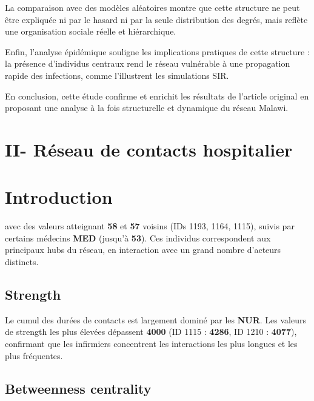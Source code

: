 \documentclass[10pt,twocolumn]{article}
\begin{document}
La comparaison avec des modèles aléatoires montre que cette structure ne peut être
expliquée ni par le hasard ni par la seule distribution des degrés, mais reflète une
organisation sociale réelle et hiérarchique.

Enfin, l’analyse épidémique souligne les implications pratiques de cette structure :
la présence d’individus centraux rend le réseau vulnérable à une propagation rapide
des infections, comme l’illustrent les simulations SIR.

En conclusion, cette étude confirme et enrichit les résultats de l’article original
en proposant une analyse à la fois structurelle et dynamique du réseau Malawi.



\section*{II- Réseau de contacts hospitalier}

\section{Introduction}

avec des valeurs atteignant \textbf{58} et \textbf{57} voisins (IDs 1193, 1164, 1115),
suivis par certains médecins \textbf{MED} (jusqu’à \textbf{53}).
Ces individus correspondent aux principaux hubs du réseau,
en interaction avec un grand nombre d’acteurs distincts.

\subsection{Strength}

Le cumul des durées de contacts est largement dominé par les \textbf{NUR}.
Les valeurs de strength les plus élevées dépassent \textbf{4000}
(ID 1115 : \textbf{4286}, ID 1210 : \textbf{4077}),
confirmant que les infirmiers concentrent les interactions les plus longues
et les plus fréquentes.

\subsection{Betweenness centrality}
\end{document}
